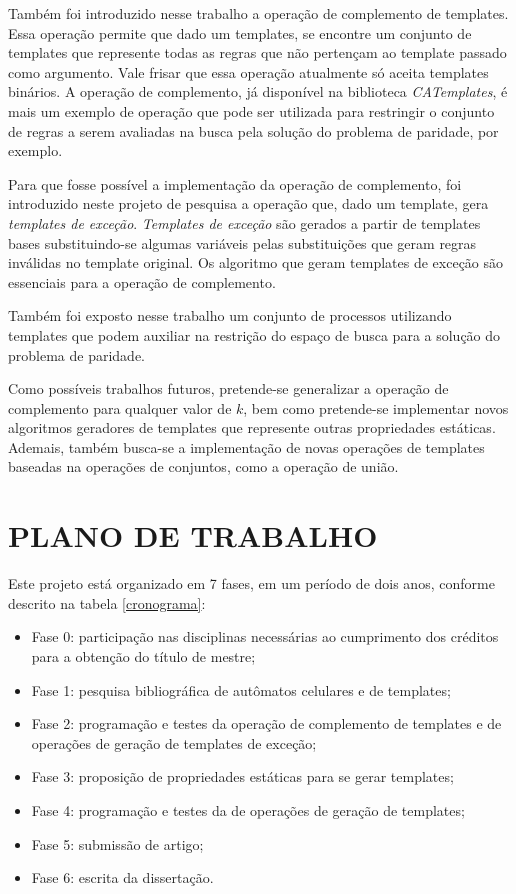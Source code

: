 \documentclass[12pt,a4paper]{article}
\let\stdsection\section
\renewcommand\section{\newpage\stdsection}
\begin{document}
Também foi introduzido nesse trabalho a operação de complemento de templates. Essa operação permite que dado um templates, se encontre um conjunto de templates que represente todas as regras que não pertençam ao template passado como argumento. Vale frisar que essa operação atualmente só aceita templates binários. A operação de complemento, já disponível na biblioteca \textit{CATemplates}, é mais um exemplo de operação que pode ser utilizada para restringir o conjunto de regras a serem avaliadas na busca pela solução do problema de paridade, por exemplo.

Para que fosse possível a implementação da operação de complemento, foi introduzido neste projeto de pesquisa a operação que, dado um template, gera \textit{templates de exceção}. \textit{Templates de exceção} são gerados a partir de templates bases substituindo-se algumas variáveis pelas substituições que geram regras inválidas no template original. Os algoritmo que geram templates de exceção são essenciais para a operação de complemento.

Também foi exposto nesse trabalho um conjunto de processos utilizando templates que podem auxiliar na restrição do espaço de busca para a solução do problema de paridade.

Como possíveis trabalhos futuros, pretende-se generalizar a operação de complemento para qualquer valor de $k$, bem como pretende-se implementar novos algoritmos geradores de templates que represente outras propriedades estáticas. Ademais, também busca-se a implementação de novas operações de templates baseadas na operações de conjuntos, como a operação de união.

\section{PLANO DE TRABALHO}

Este projeto está organizado em 7 fases, em um período de dois anos, conforme descrito na tabela \ref{cronograma}:

  \begin{itemize}
      \item Fase 0: participação nas disciplinas necessárias ao cumprimento dos créditos para a obtenção do título de mestre;
      \item Fase 1: pesquisa bibliográfica de autômatos celulares e de templates;
      \item Fase 2: programação e testes da operação de complemento de templates e de operações de geração de templates de exceção;
      \item Fase 3: proposição de propriedades estáticas para se gerar templates;
      \item Fase 4: programação e testes da de operações de geração de templates;
      \item Fase 5: submissão de artigo;
      \item Fase 6: escrita da dissertação.
  \end{itemize}
\end{document}
